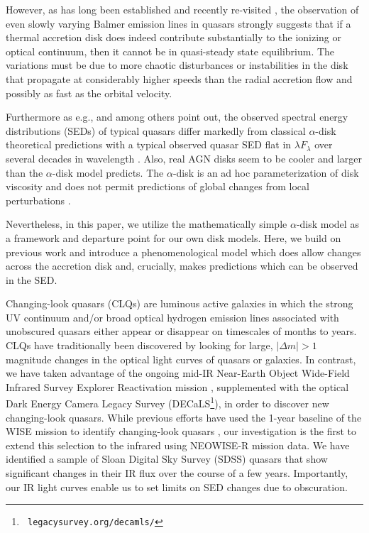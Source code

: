 \documentclass[a4paper,fleqn,usenatbib]{mnras}
\begin{document}
{However, as has long been established \citep[e.g., ][]{Alloin1985} and recently re-visited \citep[e.g., ][]{LaMassa2015, Runnoe2016, MacLeod2016, Ruan2016, Rumbaugh2017, Yang2017, Lawrence2018}, the observation of even slowly varying Balmer emission lines in quasars strongly suggests that if a thermal accretion disk does indeed contribute substantially to the ionizing or optical continuum, then it cannot be in quasi-steady state equilibrium. The variations must be due to more chaotic disturbances or instabilities in the disk that propagate at considerably higher speeds than the radial accretion flow and possibly as fast as the orbital velocity.

Furthermore as e.g., \citet{Koratkar_Blaes1999} and \citet{Sirko_Goodman2003} among others point out, the observed spectral energy distributions (SEDs) of typical quasars differ markedly from classical $\alpha$-disk theoretical predictions \citep[][]{SS73, Pringle1981} with a typical observed quasar SED flat in $\lambda F_{\lambda}$ over several decades in wavelength \citep{Elvis1994, Richards2006b}. Also, real AGN disks seem to be cooler \citep[e.g., ][]{Lawrence2012} and larger \citep[e.g.,][]{Pooley2007, Morgan2010, Morgan2012, Mosquera2011} than the $\alpha$-disk model predicts. The $\alpha$-disk is an ad hoc parameterization of disk viscosity and does not permit predictions of global changes from local perturbations \citep{King2012}. 

Nevertheless, in this paper, we utilize the mathematically simple $\alpha$-disk model as a framework and departure point for our own disk models. Here, we build on previous work \citep{Sirko_Goodman2003, Zimmerman2005, Hameury2009} and introduce a phenomenological model which does allow changes across the accretion disk and, crucially, makes predictions which can be observed in the SED.
}

Changing-look quasars (CLQs) are luminous active galaxies in which the
strong UV continuum and/or broad optical hydrogen emission lines
associated with unobscured quasars either appear or disappear on
timescales of months to years. CLQs have traditionally been discovered
by looking for large, $| \Delta m | >1$ magnitude changes in the
optical light curves of quasars or galaxies. In contrast, we have
taken advantage of the ongoing mid-IR Near-Earth Object Wide-Field
Infrared Survey Explorer Reactivation mission \citep[NEOWISE-R;
][]{Mainzer2014, Meisner2017a, Meisner2017b}, supplemented with the
optical Dark Energy Camera Legacy Survey (DECaLS\footnote{{\tt
legacysurvey.org/decamls/}}), in order to discover new changing-look
quasars.  While previous efforts have used the 1-year baseline of the
WISE mission to identify changing-look quasars
\citep[e.g.,][]{Assef2018, Stern2018}, our investigation is the first
to extend this selection to the infrared using NEOWISE-R mission
data. We have identified a sample of Sloan Digital Sky Survey (SDSS)
quasars that show significant changes in their IR flux over the course
of a few years. Importantly, our IR light curves enable us to set
limits on SED changes due to obscuration.
\end{document}
